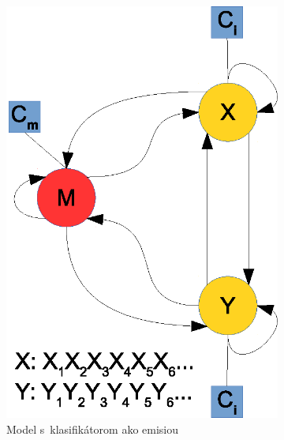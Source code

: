 \documentclass{svk_short_sk}
\begin{document}
\begin{figure}[H]
        \centering
        \begin{subfigure}[b]{0.17\textwidth}
                \includegraphics[width=\textwidth, clip=true]{images/model_clf}
                \caption{Model s~klasifikátorom ako emisiou}
                \label{fig:model-clf}
        \end{subfigure}%
        \qquad %
        \begin{subfigure}[b]{0.17\textwidth}

\end{subfigure}
\end{figure}
\end{document}
